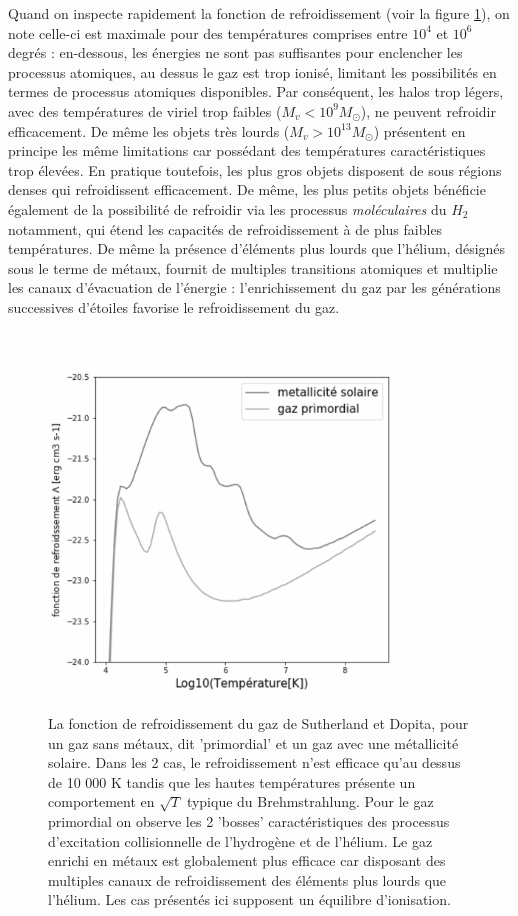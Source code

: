 Quand on inspecte rapidement la fonction de refroidissement (voir la figure \ref{f:coolins}), on note celle-ci est maximale pour des températures comprises entre $10^4$ et $10^6$ degrés : en-dessous, les énergies ne sont pas suffisantes pour enclencher les processus atomiques, au dessus le gaz est trop ionisé, limitant les possibilités en termes de processus atomiques disponibles. Par conséquent, les halos trop légers, avec des températures de viriel trop faibles ($M_v<10^9 M_\odot$), ne peuvent refroidir efficacement. De même les objets très lourds ($M_v>10^{13} M_\odot$) présentent en principe les même limitations car possédant des températures caractéristiques trop élevées. En pratique toutefois, les plus gros objets disposent de sous régions denses qui refroidissent efficacement. De même, les plus petits objets bénéficie également de la possibilité de refroidir via les processus \textit{moléculaires} du $H_2$ notamment, qui étend les capacités de refroidissement à de plus faibles températures. De même la présence d'éléments plus lourds que l'hélium, désignés sous le terme de métaux, fournit de multiples transitions atomiques et multiplie les canaux d'évacuation de l'énergie : l'enrichissement du gaz par les générations successives d'étoiles favorise le refroidissement du gaz.

\begin{figure}[htbp]
	\centering
		\includegraphics[height=10cm]{figs/cool.png}
		\caption[La fonction de refroidissement du gaz]{La fonction de refroidissement du gaz de Sutherland et Dopita, pour un gaz sans métaux, dit 'primordial' et un gaz avec une métallicité solaire. Dans les 2 cas, le refroidissement n'est efficace qu'au dessus de 10 000 K tandis que les hautes températures présente un comportement en $\sqrt{T}$ typique du Brehmstrahlung. Pour le gaz primordial on observe les 2 'bosses' caractéristiques des processus d'excitation collisionnelle de l'hydrogène et de l'hélium. Le gaz enrichi en métaux est globalement plus efficace car disposant des multiples canaux de refroidissement des éléments plus lourds que l'hélium. Les cas présentés ici supposent un équilibre d'ionisation.}
	\label{f:coolins}
\end{figure}


